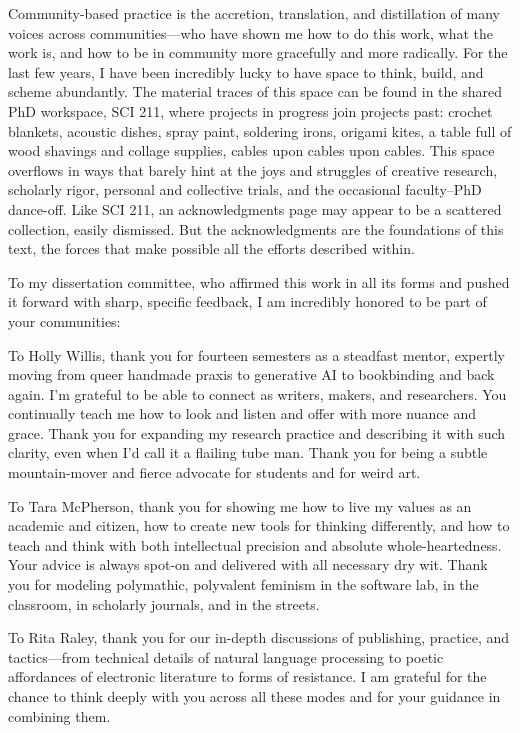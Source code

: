 Community-based practice is the accretion, translation, and distillation
of many voices across communities---who have shown me how to do this
work, what the work is, and how to be in community more gracefully and
more radically. For the last few years, I have been incredibly lucky to
have space to think, build, and scheme abundantly. The material traces
of this space can be found in the shared PhD workspace, SCI 211, where
projects in progress join projects past: crochet blankets, acoustic
dishes, spray paint, soldering irons, origami kites, a table full of
wood shavings and collage supplies, cables upon cables upon cables. This
space overflows in ways that barely hint at the joys and struggles of
creative research, scholarly rigor, personal and collective trials, and
the occasional faculty--PhD dance-off. Like SCI 211, an acknowledgments
page may appear to be a scattered collection, easily dismissed. But the
acknowledgments are the foundations of this text, the forces that make
possible all the efforts described within.

To my dissertation committee, who affirmed this work in all its forms
and pushed it forward with sharp, specific feedback, I am incredibly
honored to be part of your communities:

To Holly Willis, thank you for fourteen semesters as a steadfast mentor,
expertly moving from queer handmade praxis to generative AI to
bookbinding and back again. I'm grateful to be able to connect as
writers, makers, and researchers. You continually teach me how to look
and listen and offer with more nuance and grace. Thank you for expanding
my research practice and describing it with such clarity, even when I'd
call it a flailing tube man. Thank you for being a subtle mountain-mover
and fierce advocate for students and for weird art.

To Tara McPherson, thank you for showing me how to live my values as an
academic and citizen, how to create new tools for thinking differently,
and how to teach and think with both intellectual precision and absolute
whole-heartedness. Your advice is always spot-on and delivered with all
necessary dry wit. Thank you for modeling polymathic, polyvalent
feminism in the software lab, in the classroom, in scholarly journals,
and in the streets.

To Rita Raley, thank you for our in-depth discussions of publishing,
practice, and tactics---from technical details of natural language
processing to poetic affordances of electronic literature to forms of
resistance. I am grateful for the chance to think deeply with you across
all these modes and for your guidance in combining them.

